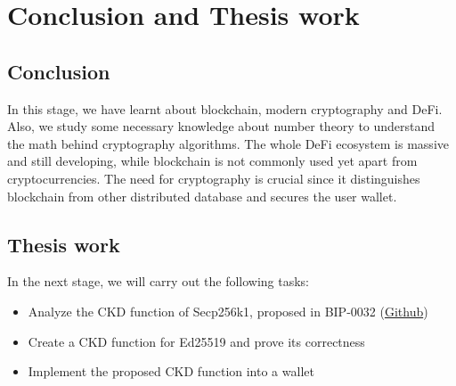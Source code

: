 \chapter{Conclusion and Thesis work} \label{chap:conclusion}

\section{Conclusion}

In this stage, we have learnt about blockchain, modern cryptography and DeFi. Also, we study some necessary knowledge about number theory to understand the math behind cryptography algorithms. The whole DeFi ecosystem is massive and still developing, while blockchain is not commonly used yet apart from cryptocurrencies. The need for cryptography is crucial since it distinguishes blockchain from other distributed database and secures the user wallet.


\section{Thesis work}

In the next stage, we will carry out the following tasks:
\begin{itemize}
  \item Analyze the CKD function of Secp256k1, proposed in BIP-0032 (\href{https://github.com/bitcoin/bips/blob/master/bip-0032.mediawiki}{Github})
  \item Create a CKD function for Ed25519 and prove its correctness
  \item Implement the proposed CKD function into a wallet
\end{itemize}